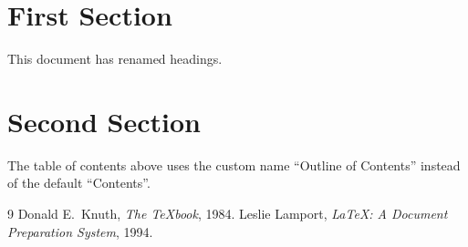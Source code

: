 \documentclass[11pt]{article}
\begin{document}
\tableofcontents

\section{First Section}
This document has renamed headings.

\section{Second Section}
The table of contents above uses the custom name
``Outline of Contents'' instead of the default ``Contents''.

\begin{thebibliography}{9}
   Donald E.\ Knuth, \emph{The \TeX book}, 1984.
   Leslie Lamport, \emph{\LaTeX: A Document
    Preparation System}, 1994.
\end{thebibliography}
\end{document}
